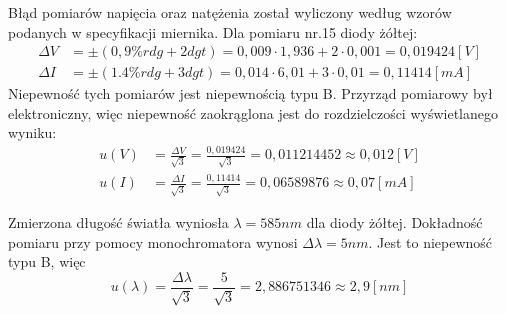 \documentclass[polish, 11pt, a4paper]{article}
\begin{document}
		Błąd pomiarów napięcia oraz natężenia został wyliczony według wzorów podanych w specyfikacji miernika. Dla pomiaru nr.15 diody żółtej:
		\begin{align*}
			\Delta V&=\pm(0,9\%rdg+2dgt) = 0,009\cdot 1,936	+ 2\cdot 0,001 = 0,019424 [V]\\
			\Delta I&=\pm(1.4\%rdg+3dgt) = 0,014\cdot 6,01 + 3\cdot 0,01 = 0,11414 [mA]
		\end{align*}
		Niepewność tych pomiarów jest niepewnością typu B. Przyrząd pomiarowy był elektroniczny, więc niepewność zaokrąglona jest do rozdzielczości wyświetlanego wyniku:
		\begin{align*}
			u(V) &= \frac{\Delta V}{\sqrt{3}} = \frac{0,019424}{\sqrt{3}} = 0,011214452	\approx 0,012 [V]\\[10pt]
			u(I) &= \frac{\Delta I}{\sqrt{3}} = \frac{0,11414}{\sqrt{3}} = 0,06589876 \approx 0,07 [mA]
		\end{align*}

		Zmierzona długość światła wyniosła \(\lambda = 585 nm\) dla diody żółtej. Dokładność pomiaru przy pomocy monochromatora wynosi \(\Delta \lambda = 5 nm\).
		Jest to niepewność typu B, więc
		\begin{displaymath}
			u(\lambda) = \frac{\Delta \lambda}{\sqrt{3}} = \frac{5}{\sqrt{3}} = 2,886751346	\approx 2,9 [nm]
		\end{displaymath}
\end{document}
